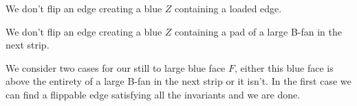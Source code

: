 \begin{invariants}
  \label{inv:uni:rest}
  \item We don't flip an edge creating a blue $Z$ containing a loaded edge.
  \label{inv:uni:noLoad}
  \item We don't flip an edge creating a blue $Z$ containing a pad of a large B-fan in the next
   strip.
  \label{inv:uni:noPad}
\end{invariants}


We consider two cases for our still to large blue face $F$, either this blue face is above the entirety of a large B-fan in the next strip or it isn't.
In the first case we can find a flippable edge satisfying all the invariants and we are done.

